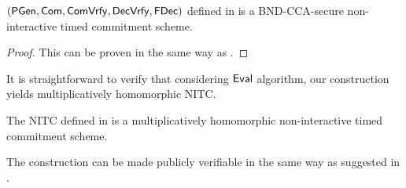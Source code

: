 \begin{theorem}
$(\mathsf{PGen}, \mathsf{Com}, \mathsf{ComVrfy}, \mathsf{DecVrfy}, \mathsf{FDec})$ defined in  is a BND-CCA-secure non-interactive timed commitment scheme. 
\end{theorem}

\begin{proof}
This can be proven in the same way as .
\end{proof}

It is straightforward to verify that considering $\mathsf{Eval}$ algorithm, our construction yields multiplicatively homomorphic NITC. 
\begin{theorem}\label{hom-mh-rom}
The NITC \mathlist{(\pgen, \com, \cvrfy, \dvrfy, \fdecom, \fdvrfy, \eval)} defined in  is a multiplicatively homomorphic non-interactive timed commitment scheme.
\end{theorem}


\begin{remark}
The construction can be made publicly verifiable in the same way as suggested in . 
 \end{remark}

